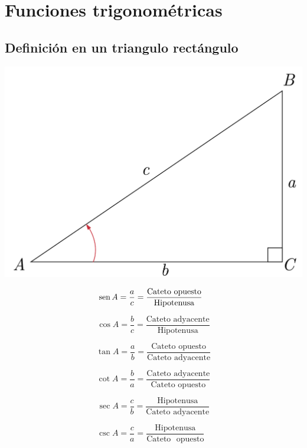  
\chapter*{Funciones trigonométricas}

\section*{Definición en un triangulo rectángulo}
\begin{minipage}[c]{0.5\textwidth}
\includegraphics[scale=0.25]{figuras/triangulo}



\end{minipage}  \begin{minipage}[c]{0.5\textwidth}
$$\operatorname{sen} A = \frac{a}{c}=\frac{\mathrm{Cateto} \,\, \mathrm{opuesto}}{\mathrm{Hipotenusa}} \,\,\,\,$$

$$\cos A = \frac{b}{c}=\frac{\mathrm{Cateto} \,\, \mathrm{adyacente}}{\mathrm{Hipotenusa}}$$

$$\tan A = \frac{a}{b}=\frac{\mathrm{Cateto} \,\, \mathrm{opuesto}}{\mathrm{Cateto} \,\, \mathrm{adyacente}}$$

$$\cot A = \frac{b}{a}=\frac{\mathrm{Cateto} \,\, \mathrm{adyacente}}{\mathrm{Cateto} \,\, \mathrm{opuesto}}$$

$$\sec A = \frac{c}{b}=\frac{\mathrm{Hipotenusa}}{\mathrm{Cateto} \,\, \mathrm{adyacente}}$$

$$\csc A = \frac{c}{a}=\frac{\mathrm{Hipotenusa}}{\mathrm{Cateto} \,\,\,\, \mathrm{opuesto}} \,\,\,\,$$


\end{minipage}
